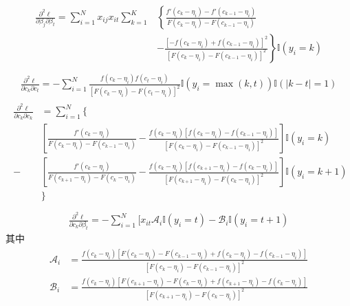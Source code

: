 \documentclass[letterpaper,10pt,english]{sphinxmanual}
\begin{document}
\begin{align}\label{equation:有序离散模型/content:有序离散模型/content:6}\!\begin{aligned}
\frac{\partial^2 \ell }{\partial \beta_j \partial \beta_t} =
\sum_{i=1}^N x_{ij} x_{it} \sum_{k=1}^K
&\left \{
\frac{f'(c_k - \eta_i) - f'(c_{k-1} - \eta_i)}{F(c_k - \eta_i)-F(c_{k-1} - \eta_i)}
\right.\\
&\left. -\frac{ [-f(c_k - \eta_i) + f(c_{k-1} - \eta_i) ]^2 }{ [ F(c_k - \eta_i)-F(c_{k-1} - \eta_i)]^2 }
\right \}\mathbb{I}(y_i=k)\\
\end{aligned}\end{align}\begin{equation}\label{equation:有序离散模型/content:有序离散模型/content:7}
\begin{split}\frac{\partial^2 \ell }{\partial c_k \partial c_t}
= - \sum_{i=1}^N
\frac{f(c_k - \eta_i)f(c_t - \eta_i)}{ [ F(c_k - \eta_i)-F(c_{t} - \eta_i)]^2 }
\mathbb{I}(y_i=\mathop{max}(k,t)) \mathbb{I}(|k-t|=1)\end{split}
\end{equation}\begin{align}\label{equation:有序离散模型/content:有序离散模型/content:8}\!\begin{aligned}
\frac{\partial^2 \ell }{\partial c_k \partial c_k}
&=  \sum_{i=1}^N  \big \{\\
&\left [
\frac{f'(c_k-\eta_i)}{F(c_k-\eta_i)-F(c_{k-1}-\eta_i)}
-\frac{f(c_k-\eta_i)[ f(c_k-\eta_i) -f(c_{k-1}-\eta_i)  ]    }{  [F(c_k-\eta_i)-F(c_{k-1}-\eta_i)]^2 }
\right ]\mathbb{I}(y_i=k)\\
-&\left [
    \frac{f'(c_k-\eta_i)}{F(c_{k+1}-\eta_i)-F(c_{k}-\eta_i)}
    -\frac{f(c_k-\eta_i)[ f(c_{k+1}-\eta_i) -f(c_{k}-\eta_i)  ]  }{  [F(c_{k+1}-\eta_i)-F(c_{k}-\eta_i)]^2 }
\right ]\mathbb{I}(y_i=k+1)\\
&\big \}\\
\end{aligned}\end{align}\begin{equation}\label{equation:有序离散模型/content:有序离散模型/content:9}
\begin{split}\frac{\partial^2 \ell }{\partial c_k \partial \beta_t} =
- \sum_{i=1}^N [
x_{it} \mathcal{A}_i \mathbb{I}(y_i=t)
- \mathcal{B}_i \mathbb{I}(y_i=t+1)\end{split}
\end{equation}
其中
\begin{align}\label{equation:有序离散模型/content:有序离散模型/content:10}\!\begin{aligned}
\mathcal{A}_i &= \frac{ f(c_k-\eta_i) [F(c_k-\eta_i)-F(c_{k-1}-\eta_i) +f(c_k-\eta_i)-f(c_{k-1}-\eta_i)  ]}
{[F(c_k-\eta_i)-F(c_{k-1}-\eta_i)]^2}\\
\mathcal{B}_i &= \frac{ f(c_k-\eta_i) [F(c_{k+1}-\eta_i)-F(c_{k}-\eta_i) +f(c_{k+1}-\eta_i)-f(c_{k}-\eta_i)  ]}
{[F(c_{k+1}-\eta_i)-F(c_{k}-\eta_i)]^2}\\
\end{aligned}\end{align}
\end{document}
